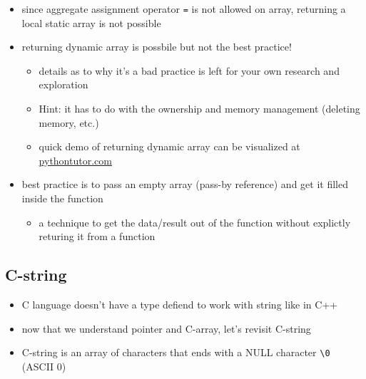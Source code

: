 \documentclass[11pt]{article}
\providecommand{\tightlist}{%
      \setlength{\itemsep}{0pt}\setlength{\parskip}{0pt}}
\begin{document}
\begin{itemize}
\tightlist
\item
  since aggregate assignment operator \texttt{=} is not allowed on
  array, returning a local static array is not possible
\item
  returning dynamic array is possbile but not the best practice!

  \begin{itemize}
  \tightlist
  \item
    details as to why it's a bad practice is left for your own research
    and exploration
  \item
    Hint: it has to do with the ownership and memory management
    (deleting memory, etc.)
  \item
    quick demo of returning dynamic array can be visualized at
    \href{http://pythontutor.com/cpp.html\#code=//\%20returning\%20dynamic\%20array\%20from\%20a\%20function\%0A//\%20not\%20recommended\%20best\%20practice!\%0A\%23include\%20\%3Ciostream\%3E\%0Ausing\%20namespace\%20std\%3B\%0A\%0Aint\%20*\%20getData\%28\%29\%20\%7B\%0A\%20\%20int\%20*\%20nums\%20\%3D\%20new\%20int\%5B2\%5D\%3B\%0A\%20\%20nums\%5B0\%5D\%20\%3D\%2010\%3B\%0A\%20\%20nums\%5B1\%5D\%20\%3D\%2020\%3B\%0A\%20\%20return\%20nums\%3B\%0A\%7D\%0A\%0Aint\%20main\%28\%29\%20\%7B\%0A\%20\%20int\%20*\%20numsPtr\%20\%3D\%20getData\%28\%29\%3B\%0A\%20\%20cout\%20\%3C\%3C\%20numsPtr\%5B0\%5D\%20\%3C\%3C\%20endl\%3B\%0A\%20\%20return\%200\%3B\%0A\%7D\&curInstr=0\&mode=display\&origin=opt-frontend.js\&py=cpp\&rawInputLstJSON=\%5B\%5D}{pythontutor.com}
  \end{itemize}
\item
  best practice is to pass an empty array (pass-by reference) and get it
  filled inside the function

  \begin{itemize}
  \tightlist
  \item
    a technique to get the data/result out of the function without
    explictly returing it from a function
  \end{itemize}
\end{itemize}

    \hypertarget{c-string}{%
\subsection{C-string}\label{c-string}}

\begin{itemize}
\tightlist
\item
  C language doesn't have a type defiend to work with string like in C++
\item
  now that we understand pointer and C-array, let's revisit C-string
\item
  C-string is an array of characters that ends with a NULL character
  \texttt{\textquotesingle{}\textbackslash{}0\textquotesingle{}} (ASCII
  0)
\end{itemize}
\end{document}

